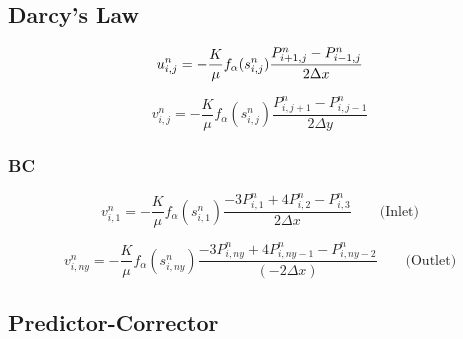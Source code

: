 \documentclass[a4paper,12pt]{article}
\begin{document}
\subsection{Darcy's Law}

\[
    u_{i,j}^n = -\frac{K}{\mu} f_\alpha (s_{i, j}^n)
    \frac{P_{i + 1, j}^n - P_{i - 1, j}^n}{2\Delta x} \\
\] 

\[
    v_{i,j}^n = -\frac{K}{\mu} f_\alpha(s_{i, j}^n)
    \frac{P_{i, j + 1}^n - P_{i, j - 1}^n}{2\Delta y}
\] 

\subsubsection{BC}

\[
    v_{i, 1}^n = -\frac{K}{\mu} f_\alpha(s_{i, 1}^n)
    \frac{-3 P_{i, 1}^n + 4 P_{i, 2}^n - P_{i, 3}^n }
    {2 \Delta x} \qquad \text{(Inlet)}
\] 

\[
    v_{i, ny}^n = -\frac{K}{\mu} f_\alpha(s_{i, ny}^n)
    \frac{-3 P_{i, ny}^n + 4 P_{i, ny - 1}^n
    - P_{i, ny - 2}^n }{(-2 \Delta x)}
    \qquad \text{(Outlet)}
\] 

\subsection{Predictor-Corrector}
\end{document}

